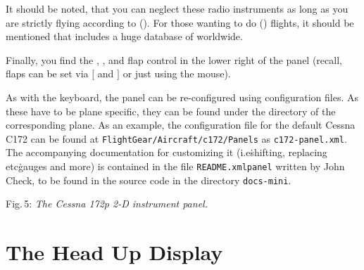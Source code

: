 It should be noted, that you can neglect these radio instruments as
long as you are strictly flying according to  (). For those wanting to do  () flights, it should be mentioned that \FlightGear{}
includes a huge database of  worldwide.

Finally, you find the , , and flap
control in
the lower right of the panel (recall, flaps can be set via $[$ and $]$ or just
using the mouse).

As with the keyboard, the panel can be
re-configured using
configuration files. As these have to be plane specific, they can be found under
the
directory of the corresponding plane. As an example, the configuration file for
the
default Cessna C172 can be found at \texttt{FlightGear/Aircraft/c172/Panels} as
\texttt{c172-panel.xml}. The accompanying documentation for customizing it
(i.e\. shifting,
replacing etc\. gauges and more) is contained in the file
\texttt{README.xmlpanel} 
written by John Check,
to be found in the source code in the directory \texttt{docs-mini}.

\medskip

\centerline{}

\smallskip
 \noindent
Fig.\,5: \textit{The Cessna 172p 2-D instrument panel.}
\medskip

\section{The Head Up Display}

